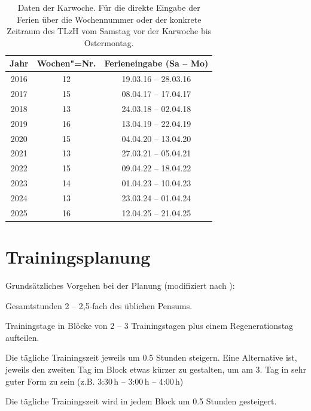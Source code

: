 \documentclass[a4paper,DIV13,BCOR0cm,draft=TRUE]{scrartcl}
\newcommand{\tlzh}{TLzH}
\begin{document}
\begin{table}
        \centering
        \begin{tabular}{ccc}
                \toprule
                    Jahr & Wochen"=Nr. & Ferieneingabe (Sa -- Mo)\\
                \midrule
                    2016 & 12 & 19.03.16 -- 28.03.16 \\
                    2017 & 15 & 08.04.17 -- 17.04.17 \\
                    2018 & 13 & 24.03.18 -- 02.04.18 \\
                    2019 & 16 & 13.04.19 -- 22.04.19 \\
                    2020 & 15 & 04.04.20 -- 13.04.20 \\
                    2021 & 13 & 27.03.21 -- 05.04.21 \\
                    2022 & 15 & 09.04.22 -- 18.04.22 \\
                    2023 & 14 & 01.04.23 -- 10.04.23 \\
                    2024 & 13 & 23.03.24 -- 01.04.24 \\
                    2025 & 16 & 12.04.25 -- 21.04.25 \\
                \bottomrule
        \end{tabular}
        \caption{Daten der Karwoche.
            Für die direkte Eingabe der Ferien über die Wochennummer oder
            der konkrete Zeitraum des \tlzh{} vom Samstag vor der Karwoche bis Ostermontag.}
        \label{tab:karwoche}
\end{table}


\section{Trainingsplanung}
\label{sec:trainingsplanung}

Grundsätzliches Vorgehen bei der Planung (modifiziert nach ):

\begin{itemize*}
        \item Gesamtstunden 2 -- 2,5-fach des üblichen Pensums.
        \item Trainingstage in Blöcke von 2 -- 3 Trainingstagen plus einem Regenerationstag aufteilen.
        \item Die tägliche Trainingszeit jeweils um 0.5 Stunden steigern.
                Eine Alternative ist, jeweils den zweiten Tag im Block etwas kürzer zu gestalten,
                um am 3. Tag in sehr guter Form zu sein (z.B. 3:30\,h -- 3:00\,h -- 4:00\,h)
        \item Die tägliche Trainingszeit wird in jedem Block um 0.5 Stunden gesteigert.
\end{itemize*}
\end{document}
